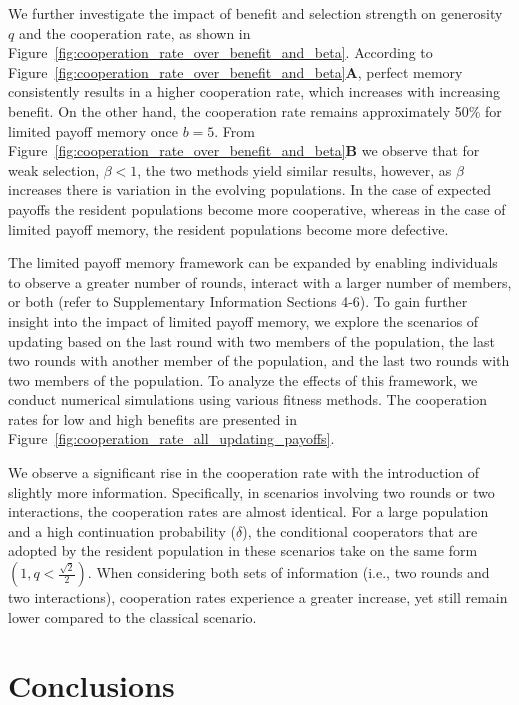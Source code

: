 \documentclass[11pt]{article}
\theoremstyle{plainCl1}
\theoremstyle{plainCl2}
\begin{document}
We further investigate the impact of benefit and selection strength on
generosity $q$ and the cooperation rate, as shown in Figure~\ref{fig:cooperation_rate_over_benefit_and_beta}.
According to Figure~\ref{fig:cooperation_rate_over_benefit_and_beta}\textbf{A},
perfect memory consistently results in a higher cooperation rate, which
increases with increasing benefit. On the other hand, the cooperation rate
remains approximately 50\% for limited payoff memory once \(b = 5\).
From Figure~\ref{fig:cooperation_rate_over_benefit_and_beta}\textbf{B}
we observe that for weak selection, \(\beta < 1\), the two methods yield similar
results, however, as \(\beta\) increases there is variation in the evolving
populations. In the case of expected payoffs the resident populations become
more cooperative, whereas in the case of limited payoff memory, the resident
populations become more defective.

The limited payoff memory framework can be expanded by enabling individuals to
observe a greater number of rounds, interact with a larger number of members, or
both (refer to Supplementary Information Sections 4-6). To gain further insight
into the impact of limited payoff memory, we explore the scenarios of updating
based on the last round with two members of the population, the last two rounds
with another member of the population, and the last two rounds with two members
of the population. To analyze the effects of this framework, we conduct
numerical simulations using various fitness methods. The cooperation rates for
low and high benefits are presented in Figure~\ref{fig:cooperation_rate_all_updating_payoffs}.

We observe a significant rise in the cooperation rate with the introduction of
slightly more information. Specifically, in scenarios involving two rounds or
two interactions, the cooperation rates are almost identical. For a large
population and a high continuation probability ($\delta$), the conditional
cooperators that are adopted by the resident population in these scenarios take
on the same form \((1, q < \frac{\sqrt{2}}{2})\). When considering both sets
of information (i.e., two rounds and two interactions), cooperation rates
experience a greater increase, yet still remain lower compared to the classical
scenario.


\section{Conclusions}\label{section:conclusions}
\end{document}
